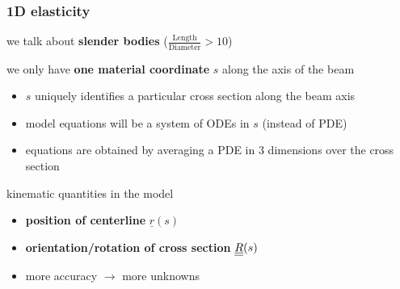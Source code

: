 \begin{frame}
  \frametitle{1D elasticity}
  
  we talk about \textbf{slender bodies} ($\frac{\mathrm{Length}}{\mathrm{Diameter}} > 10$)
  \vspace{1em}
  
  we only have \textbf{one material coordinate} $s$ along the axis of the beam
  \begin{itemize}
    \item $s$ uniquely identifies a particular cross section along the beam axis
    \item model equations will be a system of ODEs in $s$ (instead of PDE)
    \item equations are obtained by averaging a PDE in 3 dimensions over the cross section
  \end{itemize}
  \vspace{1em}
  
  kinematic quantities in the model
  \begin{itemize}
    \item \textbf{position of centerline} $\underline{r}(s)$
    \item \textbf{orientation/rotation of cross section} $\underline{\underline{R}}(s)$
    \item more accuracy $\rightarrow$ more unknowns
  \end{itemize}
\end{frame}
